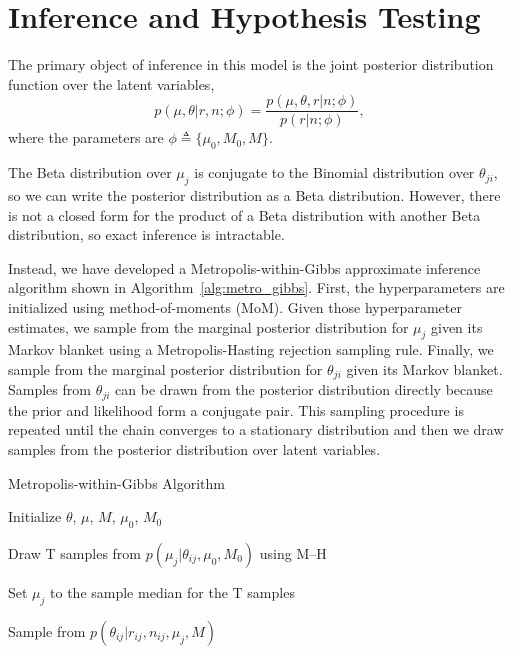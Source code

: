 \documentclass{bioinfo}
\begin{document}
\section{Inference and Hypothesis Testing}

The primary object of inference in this model is the joint posterior distribution function over the latent variables,
\begin{equation}
	p(\mu, \theta | r, n; \phi)  = \frac{ p(\mu, \theta, r | n; \phi) } {p ( r | n; \phi)},
\end{equation}
where the parameters are $\phi \triangleq \{\mu_0, M_0, M\}$.

The Beta distribution over $\mu_j$ is conjugate to the Binomial distribution over $\theta_{ji}$, so we can write the posterior distribution as a Beta distribution. However, there is not a closed form for the product of a Beta distribution with another Beta distribution, so exact inference is intractable.

Instead, we have developed a Metropolis-within-Gibbs  approximate inference algorithm shown in Algorithm~\ref{alg:metro_gibbs}. First, the hyperparameters are initialized using method-of-moments (MoM). Given those hyperparameter estimates, we sample from the marginal posterior distribution for $\mu_j$ given its Markov blanket using a Metropolis-Hasting rejection sampling rule. Finally, we sample from the marginal posterior distribution for $\theta_{ji}$ given its Markov blanket. Samples from $\theta_{ji}$ can be drawn from the posterior distribution directly  because the prior and likelihood form a conjugate pair. This sampling procedure is repeated until the chain converges to a stationary distribution and then we draw samples from the posterior distribution over latent variables.

\begin{algorithm}[ht]
  \caption{Metropolis-within-Gibbs Algorithm}
  \label{alg:metro_gibbs}
  \begin{algorithmic}[1]

  \State Initialize $\theta$, $\mu$, $M$, $\mu_0$, $M_0$

  \Repeat


    \State Draw T samples from $p \left( \mu_j |\theta_{ij},\mu_0,M_0\right)$ using M--H 

    \State Set $\mu_j$ to the sample median for the T samples


	\State Sample from $p \left( \theta_{ij} |r_{ij},n_{ij},\mu_j,M \right)$
	
      \EndFor

    \EndFor


  \end{algorithmic}
\end{algorithm}
\end{document}
